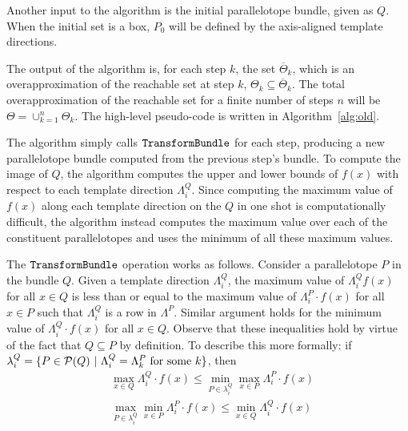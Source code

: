 Another input to the algorithm is the initial parallelotope bundle, given as $Q$. When the initial set is a box, $P_0$ will be defined by the axis-aligned template directions.

The output of the algorithm is, for each step $k$, the set $\overline\Theta_k$, which is an overapproximation of the reachable set at step $k$, $\Theta_k \subseteq \overline\Theta_k$. The total overapproximation of the reachable set for a finite number of steps $n$ will be $\Theta = \cup_{k=1}^n \Theta_k$.
%
The high-level pseudo-code is written in Algorithm~\ref{alg:old}.

The algorithm simply calls $\texttt{TransformBundle}$ for each step, producing a new parallelotope bundle computed from the previous step's bundle.
%
To compute the image of $Q$, the algorithm computes the upper and lower bounds of $f(x)$ with respect to each template direction $\Lambda_i^Q$.
%
Since computing the maximum value of $f(x)$ along each template direction on the $Q$ in one shot is computationally difficult, the algorithm instead computes the maximum value over each of the constituent parallelotopes and uses the minimum of all these maximum values.

The $\texttt{TransformBundle}$  operation works as follows.
%
Consider a parallelotope $P$ in the bundle $Q$.
%
Given a template direction $\Lambda_i^Q$, the maximum value of $\Lambda_{i}^Q f(x)$ for all $x \in Q$ is less than or equal to the maximum value of $\Lambda_{i}^P \cdot f(x)$ for all $x \in P$ such that $\Lambda_i^Q$ is a row in $\Lambda^P$.
%
Similar argument holds for the minimum value of $\Lambda_{i}^Q \cdot f(x)$ for all $x \in Q$.
%
Observe that these inequalities hold by virtue of the fact that $Q \subseteq P$ by definition.
%
To describe this more formally: if $\lambda^Q_i = \{ P \in \mathcal{P}(Q) ~|~ \Lambda_i^Q = \Lambda_k^P \text{ for some } k \}$, then
%
\begin{align}
    & \max_{x \in Q}{\Lambda_{i}^Q \cdot f(x)} \leq \min_{P \in \lambda^Q_i} {\max_{x \in P}{\Lambda_{i}^P \cdot f(x)}}  \label{eq:max_over_ptopes}
 \\
    & \max_{P \in \lambda^Q_i} {\min_{x \in P}{\Lambda_{i}^P \cdot f(x)}} \leq \min_{x \in Q}{\Lambda_{i}^Q \cdot f(x)} \label{eq:min_over_ptopes}
\end{align}

